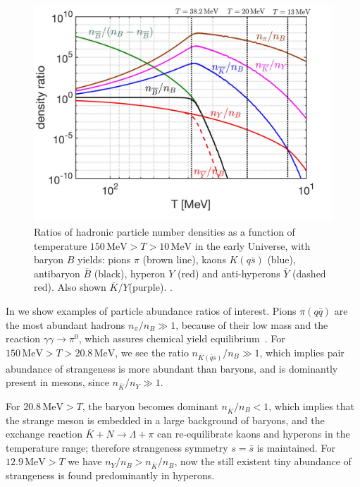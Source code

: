 \begin{figure}  
\centerline{
\includegraphics[width=0.9\linewidth]{./plots/Meson_Baryon_density_ratio_C.jpg}}
\caption{Ratios of hadronic particle number densities as a function of temperature $150\,\mathrm{MeV}> T>10\,\mathrm{MeV}$ in the early Universe, with baryon $B$ yields: pions $\pi$ (brown line), kaons $K( q\bar s)$ (blue), antibaryon $\overline B$ (black), hyperon $Y$ (red) and anti-hyperons $\overline Y$ (dashed red). Also shown $\overline K/Y$(purple). . }
\label{EquilibPartRatiosFig} 
\end{figure}

In  we show examples of particle abundance ratios of interest. %
Pions $\pi(q\bar q)$ are the most abundant hadrons $n_\pi/n_B\gg1$, because of their low mass and the reaction $\gamma\gamma\rightarrow\pi^0$, which assures chemical yield equilibrium~\cite{Kuznetsova:2008jt}. For $150\,\mathrm{MeV}>T>20.8\,\mathrm{MeV}$, we see the ratio $n_{{\overline K}(\bar q s)}/n_B\gg1$, which implies pair abundance of strangeness is more abundant than baryons, and is dominantly present in mesons, since $n_{\overline K}/n_Y\gg1$. 

For $20.8\,\mathrm{MeV}>T$, the baryon becomes dominant $n_{\overline K}/n_B<1$, which implies that the strange meson is embedded in a large background of baryons, and the exchange reaction $\overline{K}+N\rightarrow \Lambda+\pi$ can re-equilibrate kaons and hyperons in the temperature range; therefore strangeness symmetry $s=\bar s$ is maintained. For $12.9\,\mathrm{MeV}>T$ we have $n_Y/n_B>n_{\overline K}/n_B$, now the still existent tiny abundance of strangeness is found predominantly in hyperons.

